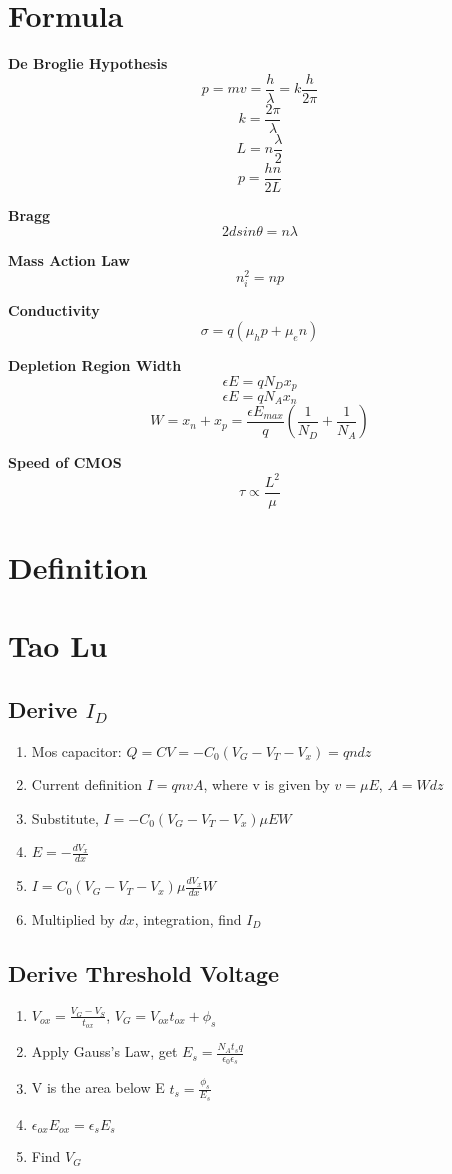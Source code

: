 \documentclass{article}
\begin{document}
\Large
  \section{Formula}
  
   \textbf{De Broglie Hypothesis}
   $$p = mv = \frac{h}{\lambda} = k\frac{h}{2\pi}$$
   $$ k = \frac{2\pi}{\lambda} $$  
   $$L = n\frac{\lambda}{2}$$
   $$ p = \frac{hn}{2L}$$
   
   \textbf{Bragg}
   $$2dsin\theta = n\lambda$$
  
  \textbf{Mass Action Law}
  $$n_i^2 = np$$
  
  \textbf{Conductivity}
  $$\sigma = q(\mu_hp+\mu_en)$$  
  
  \textbf{Depletion Region Width}
  $$ \epsilon E = qN_Dx_p $$
  $$ \epsilon E = qN_Ax_n$$ 
  $$W = x_n + x_p = \frac{\epsilon E_{max}}{q}(\frac{1}{N_D} + \frac{1}{N_A})$$
  
  \textbf{Speed of CMOS}
  $$\tau \propto \frac{L^2}{\mu}$$ 
  
  \section{Definition}
  \section{Tao Lu}
  \subsection{Derive $I_D$}
   \begin{enumerate}
     \item Mos capacitor: $Q = CV = -C_0(V_G - V_T - V_x) = qndz$
     \item Current definition $I = qnvA$, where v is given by $v = \mu E$, $A = Wdz$
     \item Substitute, $I = -C_0(V_G - V_T - V_x)\mu E W$
     \item $E = -\frac{dV_x}{dx}$
     \item $I = C_0(V_G - V_T - V_x)\mu \frac{dV_x}{dx} W$
     \item Multiplied by $dx$, integration, find $I_D$
   \end{enumerate}
   
   \subsection{Derive Threshold Voltage}
   \begin{enumerate}
     \item $V_{ox} = \frac{V_G - V_{S}}{t_{ox}}$, $V_G = V_{ox}t_{ox} + \phi_s$
     \item Apply Gauss's Law, get $E_s = \frac{N_At_sq}{\epsilon_0\epsilon_s}$ 
     \item V is the area below E $t_s = \frac{\phi_s}{E_s}$
     \item $\epsilon_{ox}E_{ox} = \epsilon_{s}E_s$
     \item Find $V_G$
   \end{enumerate}
   
\end{document}
